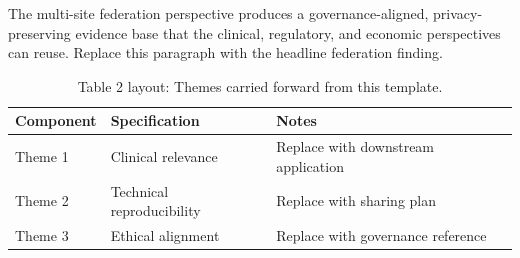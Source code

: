 
The multi-site federation perspective produces a governance-aligned, privacy-preserving evidence base that the clinical, regulatory, and economic perspectives can reuse. Replace this paragraph with the headline federation finding.

\begin{table}[H]
\caption{Table 2 layout: Themes carried forward from this template.}
\label{tab:conclusions_themes}
\centering
\begin{tabular}{>{\raggedright\arraybackslash}p{3.4cm} >{\raggedright\arraybackslash}p{4.6cm} >{\raggedright\arraybackslash}p{5.4cm}}
\toprule
\textbf{Component} & \textbf{Specification} & \textbf{Notes} \\
\midrule
  Theme 1 & Clinical relevance & Replace with downstream application \\
  Theme 2 & Technical reproducibility & Replace with sharing plan \\
  Theme 3 & Ethical alignment & Replace with governance reference \\
\bottomrule
\end{tabular}
\end{table}
